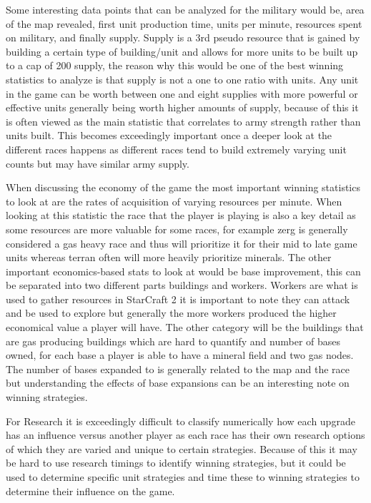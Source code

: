 \documentclass[a4paper,12pt]{report}
\begin{document}
Some interesting data points that can be analyzed for the military would be, area of the map revealed, first unit production time, units per minute, resources spent on military, and finally supply. Supply is a 3rd pseudo resource that is gained by building a certain type of building/unit and allows for more units to be built up to a cap of 200 supply, the reason why this would be one of the best winning statistics to analyze is that supply is not a one to one ratio with units. Any unit in the game can be worth between one and eight supplies with more powerful or effective units generally being worth higher amounts of supply, because of this it is often viewed as the main statistic that correlates to army strength rather than units built. This becomes exceedingly important once a deeper look at the different races happens as different races tend to build extremely varying unit counts but may have similar army supply.

When discussing the economy of the game the most important winning statistics to look at are the rates of acquisition of varying resources per minute. When looking at this statistic the race that the player is playing is also a key detail as some resources are more valuable for some races, for example zerg is generally considered a gas heavy race and thus will prioritize it for their mid to late game units whereas terran often will more heavily prioritize minerals. The other important economics-based stats to look at would be base improvement, this can be separated into two different parts buildings and workers. Workers are what is used to gather resources in StarCraft 2 it is important to note they can attack and be used to explore but generally the more workers produced the higher economical value a player will have. The other category will be the buildings that are gas producing buildings which are hard to quantify and number of bases owned, for each base a player is able to have a mineral field and two gas nodes. The number of bases expanded to is generally related to the map and the race but understanding the effects of base expansions can be an interesting note on winning strategies.

For Research it is exceedingly difficult to classify numerically how each upgrade has an influence versus another player as each race has their own research options of which they are varied and unique to certain strategies. Because of this it may be hard to use research timings to identify winning strategies, but it could be used to determine specific unit strategies and time these to winning strategies to determine their influence on the game.
\end{document}
